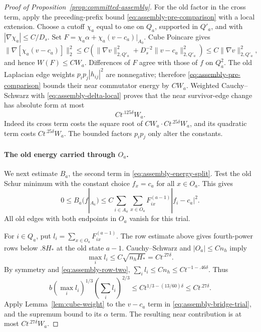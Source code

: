 \begin{proof}[Proof of Proposition~\ref{prop:committed-assembly}]
For the old factor in the cross term, apply the preceding-prefix bound
\eqref{eq:assembly-pre-comparison} with a local extension. Choose a cutoff
$\chi_a$ equal to one on $Q_a$, supported in
$Q'_a$, and with $|\nabla\chi_a|\le C/D_s$.  Set
$F=\chi_a\alpha+\chi_a(v-c_a)|_{A_0}$.  Cube Poincare gives
\[
 \|\nabla[\chi_a(v-c_a)]\|_2^2
 \le C\left(\|\nabla v\|_{2,Q'_a}^2
       +D_s^{-2}\|v-c_a\|_{2,Q'_a}^2\right)
 \le C\|\nabla v\|_{2,Q'_a}^2,
\]
and hence $W(F)\le CW_a$.  Differences of $F$ agree with
those of $f$ on $Q_a^2$.  The old Laplacian edge weights
$p_ip_j|h_{ij}|^2$ are nonnegative; therefore
\eqref{eq:assembly-pre-comparison} bounds their near commutator
energy by $CW_a$.  Weighted Cauchy--Schwarz with
\eqref{eq:assembly-delta-local} proves that the near survivor-edge
change has absolute form at most
\begin{equation}
 Ct^{.125\delta}W_a.
 \label{eq:assembly-survivor-energy}
\end{equation}
Indeed its cross term costs the square root of
$CW_a\cdot Ct^{.25\delta}W_a$, and its quadratic term costs
$Ct^{.25\delta}W_a$.  The bounded factors $p_ip_j$ only alter
the constants.

\paragraph{The old energy carried through $O_a$.}
We next estimate $B_a$, the second term in
\eqref{eq:assembly-energy-split}. Test the old Schur minimum with the
constant choice $f_x=c_a$ for all $x\in O_a$. This gives
\begin{equation}
 0\le B_a(f|_{A_a})
 \le C\sum_{i\in A_a}\sum_{x\in O_a}
 F^{(a-1)}_{ix}|f_i-c_a|^2.
 \label{eq:assembly-bridge-trial}
\end{equation}
All old edges with both endpoints in $O_a$ vanish for this trial.

For $i\in Q_a$, put $l_i=\sum_{x\in O_a}F^{(a-1)}_{ix}$.
The row estimate above gives fourth-power rows below $.8H_*$ at the old
state $a-1$. Cauchy--Schwarz and
$|O_a|\le Cn_h$ imply
\[
 \max_i l_i\le C\sqrt{n_hH_*}=Ct^{.27\delta}.
\]
By symmetry and \eqref{eq:assembly-row-two},
$\sum_i l_i\le Cn_h\le Ct^{-1-.46\delta}$.  Thus
\[
 b(\max_i l_i)^{1/3}(\sum_i l_i)^{2/3}
 \le Ct^{1/3-(13/60)\delta}
 \le Ct^{.27\delta}.
\]
Apply Lemma~\ref{lem:cube-weight} to the $v-c_a$ term in
\eqref{eq:assembly-bridge-trial}, and the supremum bound to its
$\alpha$ term.  The resulting near contribution is at most
$Ct^{.27\delta}W_a$.


\end{proof}
